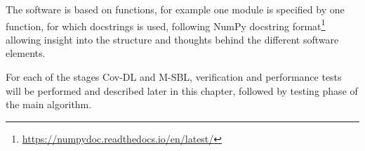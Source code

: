 The software is based on functions, for example one module is specified by one function, for which docstrings is used, following NumPy docstring format\footnote{\url{https://numpydoc.readthedocs.io/en/latest/}} allowing insight into the structure and thoughts behind the different software elements.

For each of the stages Cov-DL and M-SBL, verification and performance tests will be performed and described later in this chapter, followed by testing phase of the main algorithm. 
